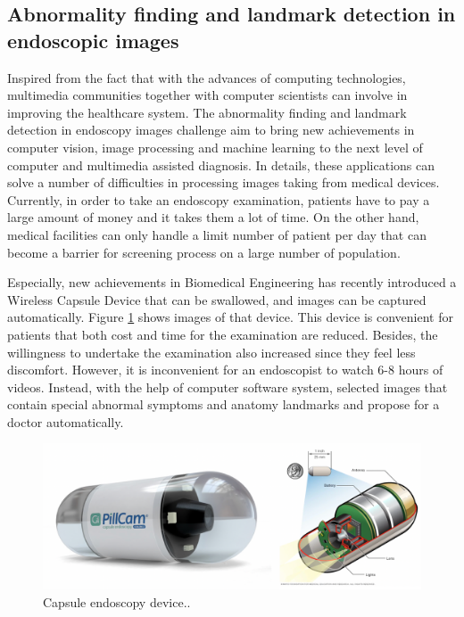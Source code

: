 \subsection{Abnormality finding and landmark detection in endoscopic images}
Inspired from the fact that with the advances of computing technologies, multimedia communities together with computer scientists can involve in improving the healthcare system. The abnormality finding and landmark detection in endoscopy images challenge aim to bring new achievements in computer vision, image processing and machine learning to the next level of computer and multimedia assisted diagnosis. In details, these applications can solve a number of difficulties in processing images taking from medical devices. Currently, in order to take an endoscopy examination, patients have to pay a large amount of money and it takes them a lot of time. On the other hand, medical facilities can only handle a limit number of patient per day that can become a barrier for screening process on a 
large number of population.

Especially, new achievements in Biomedical Engineering has recently introduced a Wireless Capsule Device \cite{Moglia2007} that can be swallowed, and images can be captured automatically. Figure \ref{fig:capsule_device} shows images of that device. This device is convenient for patients that both cost and time for the examination are reduced. Besides, the willingness to undertake the examination also increased since they feel less discomfort. However, it is inconvenient for an endoscopist to watch 6-8 hours of videos. Instead, with the help of computer software system, selected images that contain special abnormal symptoms and anatomy landmarks and propose for a doctor automatically. 


\begin{figure}[thb]
	\centering \includegraphics[width=0.9\columnwidth]{endoscopy_resources/capsule_endoscopy_img.png}
	\caption[Capsule endoscopy device.]{Capsule endoscopy device.\footnotemark.}
	\label{fig:capsule_device}
\end{figure}

